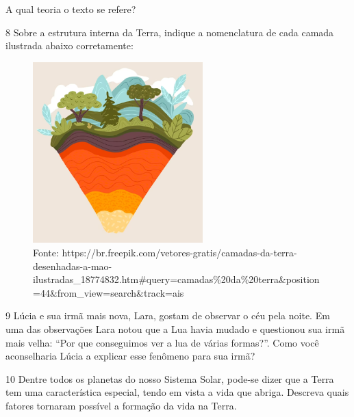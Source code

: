 A qual teoria o texto se refere?



\num{8} Sobre a estrutura interna da Terra, indique a nomenclatura de cada camada ilustrada abaixo corretamente:

\begin{figure}[htpb!]
\includegraphics[width=2.58803in,height=2.75652in]{./imgs/img11.png}
\caption{Fonte: https://br.freepik.com/vetores-gratis/camadas-da-terra-desenhadas-a-mao-ilustradas\_18774832.htm\#query=camadas\%20da\%20terra\&position=44\&from\_view=search\&track=ais}
\end{figure}



\num{9}  Lúcia e sua irmã mais nova, Lara, gostam de observar o céu pela noite.
  Em uma das observações Lara notou que a Lua havia mudado e questionou
  sua irmã mais velha: ``Por que conseguimos ver a lua de várias
  formas?''. Como você aconselharia Lúcia a explicar esse fenômeno para
  sua irmã?



\num{10}  Dentre todos os planetas do nosso Sistema Solar, pode-se dizer que a
  Terra tem uma característica especial, tendo em vista a vida que
  abriga. Descreva quais fatores tornaram possível a formação da vida na
  Terra.



